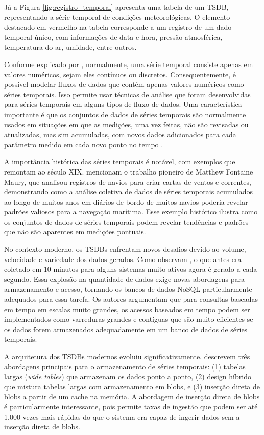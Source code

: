 Já a Figura \ref{fig:registro_temporal} apresenta uma tabela de um TSDB, representando a série temporal de condições meteorológicas. O elemento destacado em vermelho na tabela corresponde a um registro de um dado temporal único, com informações de data e hora, pressão atmosférica, temperatura do ar, umidade, entre outros.

Conforme explicado por , normalmente, uma série temporal consiste apenas em valores numéricos, sejam eles contínuos ou discretos. Consequentemente, é possível modelar fluxos de dados que contêm apenas valores numéricos como séries temporais. Isso permite usar técnicas de análise que foram desenvolvidas para séries temporais em alguns tipos de fluxo de dados. Uma característica importante é que os conjuntos de dados de séries temporais são normalmente usados em situações em que as medições, uma vez feitas, não são revisadas ou atualizadas, mas sim acumuladas, com novos dados adicionados para cada parâmetro medido em cada novo ponto no tempo .

A importância histórica das séries temporais é notável, com exemplos que remontam ao século XIX.  mencionam o trabalho pioneiro de Matthew Fontaine Maury, que analisou registros de navios para criar cartas de ventos e correntes, demonstrando como a análise coletiva de dados de séries temporais acumulados ao longo de muitos anos em diários de bordo de muitos navios poderia revelar padrões valiosos para a navegação marítima. Esse exemplo histórico ilustra como os conjuntos de dados de séries temporais podem revelar tendências e padrões que não são aparentes em medições pontuais.

No contexto moderno, os TSDBs enfrentam novos desafios devido ao volume, velocidade e variedade dos dados gerados. Como observam , o que antes era coletado em 10 minutos para alguns sistemas muito ativos agora é gerado a cada segundo. Essa explosão na quantidade de dados exige novas abordagens para armazenamento e acesso, tornando os bancos de dados NoSQL particularmente adequados para essa tarefa. Os autores argumentam que para consultas baseadas em tempo em escalas muito grandes, os acessos baseados em tempo podem ser implementados como varreduras grandes e contíguas que são muito eficientes se os dados forem armazenados adequadamente em um banco de dados de séries temporais.

A arquitetura dos TSDBs modernos evoluiu significativamente.  descrevem três abordagens principais para o armazenamento de séries temporais: (1) tabelas largas (\textit{wide tables}) que armazenam os dados ponto a ponto, (2) design híbrido que mistura tabelas largas com armazenamento em blobs, e (3) inserção direta de blobs a partir de um cache na memória. A abordagem de inserção direta de blobs é particularmente interessante, pois permite taxas de ingestão que podem ser até 1.000 vezes mais rápidas do que o sistema era capaz de ingerir dados sem a inserção direta de blobs.

